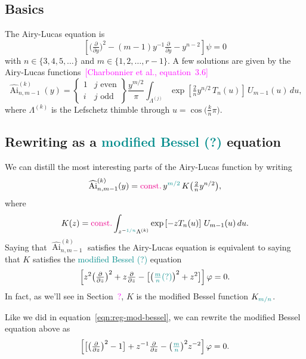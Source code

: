 \documentclass{article}
\theoremstyle{plain}
\DeclareMathOperator{\Ai}{Ai}
\begin{document}
\subsection{Basics}
The Airy-Lucas equation is
\begin{equation}\label{eqn:airy-lucas}
\left[\big(\tfrac{\partial}{\partial y}\big)^2 - (m-1) y^{-1} \tfrac{\partial}{\partial y} - y^{n-2}\right] \psi = 0
\end{equation}
with $n \in \{3, 4, 5, \ldots\}$ and $m \in \{1, 2, \ldots, r-1\}$. A few solutions are given by the Airy-Lucas functions~\textcolor{magenta}{[Charbonnier et al., equation~3.6]}
\[ \widehat{\Ai}^{(k)}_{n, m-1}(y) = \left\{\begin{array}{ll}1 & j \text{ even} \\ i & j \text{ odd}\end{array}\right\} \frac{y^{m/2}}{\pi} \int_{\Lambda^{(j)}} \exp\left[\tfrac{2}{n} y^{n/2}\,T_n(u)\right]\,U_{m-1}(u)\,du, \]
where $\Lambda^{(k)}$ is the Lefschetz thimble through $u = \cos\big(\tfrac{k}{n}\pi\big)$.
\subsection{Rewriting as a \textcolor{DarkCyan}{modified Bessel (?)} equation}
We can distill the most interesting parts of the Airy-Lucas function by writing
\[ \widehat{\Ai}^{(k)}_{n, m-1}(y) = \textcolor{magenta}{\text{const.}}\,y^{\textcolor{DarkCyan}{m/2}}\,K\big(\tfrac{2}{n} y^{n/2}\big), \]
where
\begin{equation}\label{integral:mod-bessel-rational}
K(z) = \textcolor{magenta}{\text{const.}} \int_{z^{-\textcolor{DarkCyan}{1/n}}\Lambda^{(k)}} \exp\left[-z T_n(u)\right]\,U_{m-1}(u)\,du.
\end{equation}
Saying that $\widehat{\Ai}^{(k)}_{n, m-1}$ satisfies the Airy-Lucas equation is equivalent to saying that $K$ satisfies the \textcolor{DarkCyan}{modified Bessel (?)} equation
\begin{equation}%
\left[z^2 \big(\tfrac{\partial}{\partial z}\big)^2 + z \tfrac{\partial}{\partial z} - \big[\big(\textcolor{DarkCyan}{\tfrac{m}{n} (?)}\big)^2 + z^2\big]\right] \varphi = 0.
\end{equation}
In fact, as we'll see in Section~\textcolor{magenta}{?}, $K$ is the modified Bessel function $K_{\textcolor{DarkCyan}{m/n}}$.

Like we did in equation~\ref{eqn:reg-mod-bessel}, we can rewrite the modified Bessel equation above as
\begin{equation}%
\left[ \big[ \big(\tfrac{\partial}{\partial z}\big)^2 - 1 \big] + z^{-1} \tfrac{\partial}{\partial z} - \big(\textcolor{DarkCyan}{\tfrac{m}{n}}\big)^2 z^{-2} \right] \varphi = 0.
\end{equation}
\end{document}
